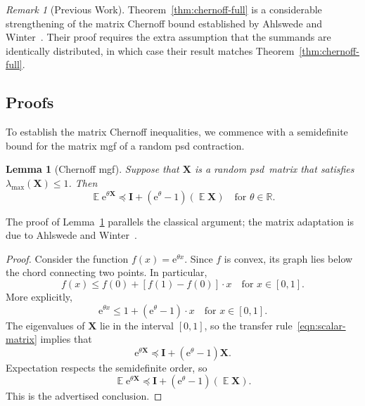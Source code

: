 \documentclass[11pt,letterpaper,twoside,reqno,draft]{amsart}
\newtheorem{lemma}[thm]{Lemma}
\theoremstyle{remark}
\newtheorem{rem}[thm]{Remark}
\numberwithin{equation}{section}
\numberwithin{thm}{section}
\begin{document}
\begin{rem}[Previous Work]
Theorem~\ref{thm:chernoff-full} is a considerable strengthening of the matrix Chernoff bound established by Ahlswede and Winter~\cite[Thm.~19]{AW02:Strong-Converse}.  Their proof requires the extra assumption that the summands are identically distributed, in which case their result matches Theorem~\ref{thm:chernoff-full}.
\end{rem}

\subsection{Proofs} \label{sec:chernoff-proofs}

To establish the matrix Chernoff inequalities, we commence with a semidefinite bound for the matrix mgf of a random psd contraction.

  

\begin{lemma}[Chernoff mgf] \label{lem:chernoff-mgf}
Suppose that ${\bm{{X}}}$ is a random psd~matrix that satisfies $\lambda_{\max}({\bm{{X}}}) \leq 1$.  Then
$$
{\operatorname{\mathbb{E}}} {\mathrm{e}}^{\theta{\bm{{X}}}}
	{\preccurlyeq} {\mathbf{I}} +  ({\mathrm{e}}^{\theta} - 1)({\operatorname{\mathbb{E}}} {\bm{{X}}})
\quad\text{for $\theta \in \mathbb{R}$}.
$$
\end{lemma}

The proof of Lemma~\ref{lem:chernoff-mgf} parallels the classical argument; the matrix adaptation is due to Ahlswede and Winter~\cite[Thm.~19]{AW02:Strong-Converse}.

\begin{proof}
Consider the function $f(x) = {\mathrm{e}}^{\theta x}$.  Since $f$ is convex, its graph lies below the chord connecting two points.  In particular,
$$
f(x) \leq f(0) + [f(1) - f(0)] \cdot x
\quad\text{for $x \in [0, 1]$.}
$$
More explicitly,
$$
{\mathrm{e}}^{\theta x} \leq 1 + ({\mathrm{e}}^{\theta} - 1) \cdot x
\quad\text{for $x \in [0, 1]$.}
$$
The eigenvalues of ${\bm{{X}}}$ lie in the interval $[0, 1]$, so the transfer rule~\eqref{eqn:scalar-matrix} implies that
$$
{\mathrm{e}}^{\theta {\bm{{X}}}} {\preccurlyeq} {\mathbf{I}} + ({\mathrm{e}}^{\theta} - 1) {\bm{{X}}}.
$$
Expectation respects the semidefinite order, so
$$
{\operatorname{\mathbb{E}}} {\mathrm{e}}^{\theta {\bm{{X}}}}
	{\preccurlyeq} {\mathbf{I}} + ({\mathrm{e}}^{\theta} - 1) ({\operatorname{\mathbb{E}}}{\bm{{X}}}).
$$
This is the advertised conclusion.
\end{proof}
\end{document}
